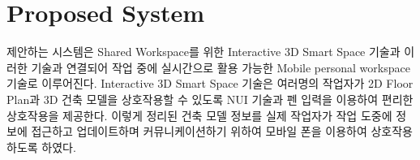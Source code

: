 
\section{Proposed System}


제안하는 시스템은 Shared Workspace를 위한 Interactive 3D Smart Space 기술과 이러한 기술과 연결되어 작업 중에 실시간으로 활용 가능한 Mobile personal workspace 기술로 이루어진다. Interactive 3D Smart Space 기술은 여러명의 작업자가 2D Floor Plan과 3D 건축 모델을 상호작용할 수 있도록 NUI 기술과 펜 입력을 이용하여 편리한 상호작용을 제공한다. 이렇게 정리된 건축 모델 정보를 실제 작업자가 작업 도중에 정보에 접근하고 업데이트하며 커뮤니케이션하기 위하여 모바일 폰을 이용하여 상호작용하도록 하였다.

